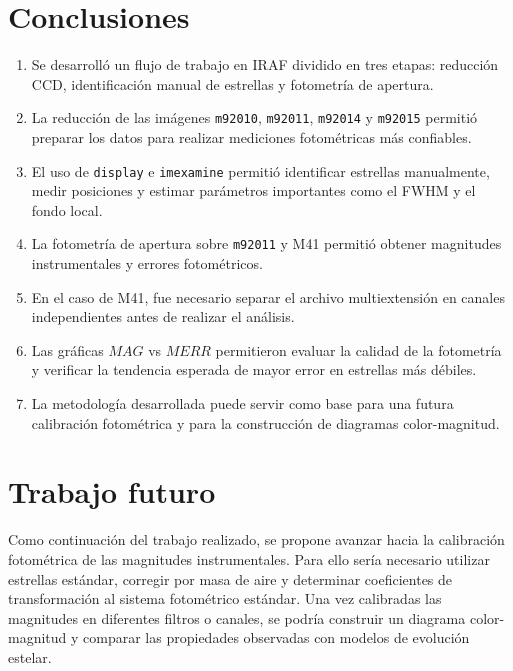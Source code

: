 \documentclass[12pt,letterpaper]{article}
\begin{document}
\section{Conclusiones}

\begin{enumerate}
    \item Se desarrolló un flujo de trabajo en IRAF dividido en tres etapas: reducción CCD, identificación manual de estrellas y fotometría de apertura.

    \item La reducción de las imágenes \texttt{m92010}, \texttt{m92011}, \texttt{m92014} y \texttt{m92015} permitió preparar los datos para realizar mediciones fotométricas más confiables.

    \item El uso de \texttt{display} e \texttt{imexamine} permitió identificar estrellas manualmente, medir posiciones y estimar parámetros importantes como el FWHM y el fondo local.

    \item La fotometría de apertura sobre \texttt{m92011} y M41 permitió obtener magnitudes instrumentales y errores fotométricos.

    \item En el caso de M41, fue necesario separar el archivo multiextensión en canales independientes antes de realizar el análisis.

    \item Las gráficas $MAG$ vs $MERR$ permitieron evaluar la calidad de la fotometría y verificar la tendencia esperada de mayor error en estrellas más débiles.

    \item La metodología desarrollada puede servir como base para una futura calibración fotométrica y para la construcción de diagramas color-magnitud.
\end{enumerate}

\section{Trabajo futuro}

Como continuación del trabajo realizado, se propone avanzar hacia la calibración fotométrica de las magnitudes instrumentales. Para ello sería necesario utilizar estrellas estándar, corregir por masa de aire y determinar coeficientes de transformación al sistema fotométrico estándar. Una vez calibradas las magnitudes en diferentes filtros o canales, se podría construir un diagrama color-magnitud y comparar las propiedades observadas con modelos de evolución estelar.
\end{document}
